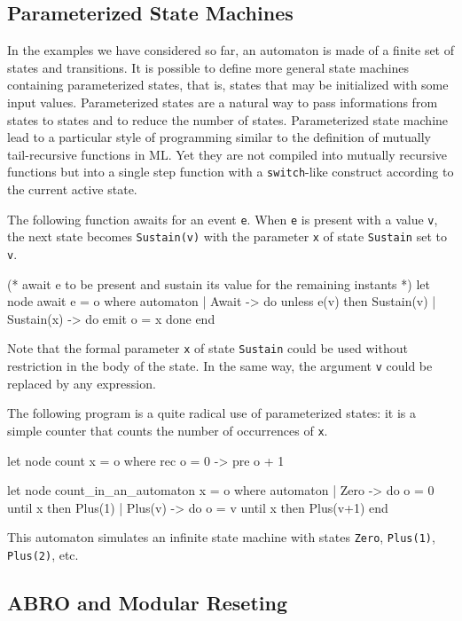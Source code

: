 \documentclass[11pt,titlepage,twoside]{report}
\begin{document}
\subsection{Parameterized State Machines} %
In the examples we have considered so far, an automaton is made of a
finite set of states and transitions. It is possible to define more
general state machines containing parameterized states, that is,
states that may be initialized with some input values. Parameterized
states are a natural way to pass informations from states to states
and to reduce the number of states. Parameterized state machine
lead to a particular style of programming similar to the
definition of mutually tail-recursive functions in ML. Yet they are not
compiled into mutually recursive functions but into a single step
function with a \texttt{switch}-like construct according to the current
active state.

The following function awaits for an event \texttt{e}. When \texttt{e} is present with
a value \texttt{v}, the next state becomes \texttt{Sustain(v)} with the parameter
\texttt{x} of state \texttt{Sustain} set to \texttt{v}.
\begin{runverbatim}[withresult,label=await]
(* await e to be present and sustain its value for the remaining instants *)
let node await e = o where 
  automaton
  | Await -> do unless e(v) then Sustain(v)
  | Sustain(x) -> do emit o = x done
  end
\end{runverbatim}

Note that the formal parameter \verb-x- of state \verb-Sustain- could
be used without restriction in the body of the state. In the same way, the
argument \verb-v- could be replaced by any expression.

\medskip
The following program is a quite radical use of parameterized states: it
is a simple counter that counts the number of
occurrences of \verb-x-.

\begin{runverbatim}[withresult]
let node count x = o where rec o = 0 -> pre o + 1

let node count_in_an_automaton x = o where
  automaton
  | Zero -> do o = 0 until x then Plus(1)
  | Plus(v) -> do o = v until x then Plus(v+1)
  end
\end{runverbatim}

This automaton simulates an infinite state machine with states
\verb-Zero-, \verb-Plus(1)-, \verb-Plus(2)-, etc.

\subsection{ABRO and Modular Reseting} %
\end{document}

